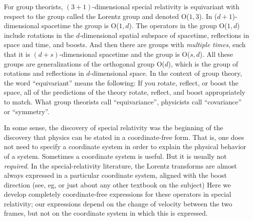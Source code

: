 \documentclass{article}
\newcommand{\plus}{\!+\!} %
\begin{document}
For group theorists, $(3\plus1)$-dimensional special relativity is equivariant with respect to the group called the Lorentz group and denoted O($1,3$).
In ($d\plus1$)-dimensional spacetime the group is O($1,d$).
The operators in the group O($1,d$) include rotations in the $d$-dimensional spatial subspace of spacetime, reflections in space and time, and boosts.
And then there are groups with \emph{multiple times}, such that it is $(d\plus s)$-dimensional spacetime and the group is O($s,d$).
All these groups are generalizations of the orthogonal group O($d$), which is the group of rotations and reflections in $d$-dimensional space.
In the context of group theory, the word ``equivariant'' means the following:
If you rotate, reflect, or boost the space, all of the predictions of the theory rotate, reflect, and boost appropriately to match.
What group theorists call ``equivariance'', physicists call ``covariance'' or ``symmetry''.

In some sense, the discovery of special relativity was the beginning of the discovery that physics can be stated in a coordinate-free form.
That is, one does not need to specify a coordinate system in order to explain the physical behavior of a system.
Sometimes a coordinate system is useful.
But it is usually not \emph{required}.
In the special-relativity literature, the Lorentz transforms are almost always expressed in a particular coordinate system, aligned with the boost direction (see, eg, \cite{french, zakamska} or just about any other textbook on the subject)
Here we develop completely coordinate-free expressions for these operators in special relativity; our expressions depend on the change of velocity between the two frames, but not on the coordinate system in which this is expressed.
\end{document}
